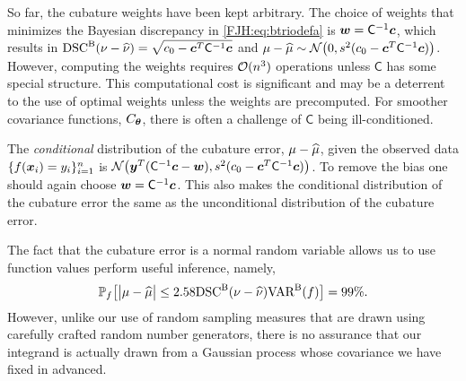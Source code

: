 \documentclass[graybox,footinfo]{svmult}
\begin{document}
So far, the cubature weights have been kept arbitrary.  The choice of weights that 
minimizes the Bayesian discrepancy in \eqref{FJH:eq:btriodefa} is ${\boldsymbol{w}} = 
\mathsf{C}^{-1} {\boldsymbol{c}}$, which results in $\textup{DSC}^{\textup{B}}(\nu - \widehat{\nu}) = \sqrt{c_0 - {\boldsymbol{c}} ^T 
\mathsf{C}^{-1} {\boldsymbol{c}}}$ and $\mu - \widehat{\mu} \sim {\mathcal{N}} \bigl(0 , s^2(c_0 - {\boldsymbol{c}} ^T 
\mathsf{C}^{-1} {\boldsymbol{c}}) \bigr)$.  However, computing the weights requires ${\mathcal{O}}(n^3)$ 
operations 
unless $\mathsf{C}$ has some special structure.  This computational cost is significant 
and may be a deterrent to the use of optimal weights unless the weights are 
precomputed. For smoother covariance functions, $C_{\boldsymbol{\theta}}$, there is often a 
challenge of $\mathsf{C}$ being ill-conditioned.

The \emph{conditional} distribution of the cubature error, $\mu - \widehat{\mu}$, given the 
observed data $ \{f({\boldsymbol{x}}_i )= y_i\}_{i=1}^n$ is ${\mathcal{N}} \bigl( {\boldsymbol{y}}^T (\mathsf{C}^{-1}{\boldsymbol{c}} - 
{\boldsymbol{w}}) , s^2(c_0 - {\boldsymbol{c}} ^T \mathsf{C}^{-1} {\boldsymbol{c}}) \bigr)$.  To remove the bias one should again 
choose ${\boldsymbol{w}} = \mathsf{C}^{-1} {\boldsymbol{c}}$.  This also makes the conditional distribution of 
the cubature error the same as the unconditional distribution of the cubature error.

The fact that the cubature error is a normal random variable allows us to use function 
values perform useful inference, namely, 
\begin{equation} \label{FJH:eq:MLEBdOne}
\bbP_f\bigl[\abs{\mu - \hmu} \le 2.58 
\disc^{\Ba}(\nu - \hnu) \Var^{\Ba}(f)\bigr] = 99\%.
\end{equation}
However, unlike our use of random sampling measures that are drawn using carefully 
crafted random number generators, there is no assurance that our integrand is actually 
drawn from a Gaussian process whose covariance we have fixed in advanced.  
\end{document}
